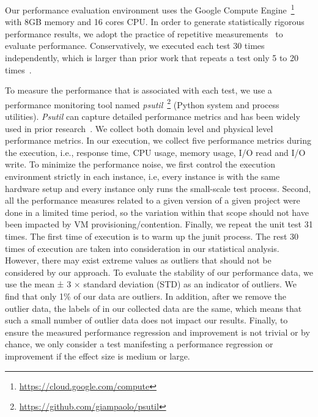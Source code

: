 
Our performance evaluation environment uses the Google Compute Engine~\footnote{\url{https://cloud.google.com/compute}} with 8GB memory and 16 cores CPU. In order to generate statistically rigorous performance results, we adopt the practice of repetitive measurements~\cite{peterfse} to evaluate performance. Conservatively, we executed each test 30 times independently, which is larger than prior work that  %
repeats a test only 5 to 20 times~\cite{Laaber2018MSR, Leitner2016TIT,DBLP:journals/ese/LaaberSL19}. 

To measure the performance that is associated with each test, we %
use a performance monitoring tool named \emph{psutil}~\footnote{\url{https://github.com/giampaolo/psutil}} (Python system and process utilities). %
\emph{Psutil} can capture detailed performance metrics and has been widely used in prior research~\cite{DBLP:conf/icsm/ChenS17,DBLP:conf/wosp/YaoPSSTS18}. We collect both domain level and physical level performance metrics. In our execution, we collect five performance metrics during the execution, i.e., response time, CPU usage, memory usage, I/O read and I/O write. 
To minimize the performance noise, we first control the execution environment strictly in each instance, i.e, every instance is with the same hardware setup and every instance only runs the small-scale test process. Second, all the performance measures related to a given version of a given project were done in a limited time period, so the variation within that scope should not have been impacted by VM provisioning/contention. Finally, we repeat the unit test 31 times. The first time of execution is to warm up the junit process. The rest 30 times of execution are taken into consideration in our statistical analysis. 
However, there may exist extreme values as outliers that should not be considered by our approach. To evaluate the stability of our performance data, we use the mean ± 3 × standard deviation (STD) as an indicator of outliers. We find that only 1\% of our data are outliers. In addition, after we remove the outlier data, the labels of \inconsistent in our collected data are the same, which means that such a small number of outlier data does not impact our results.  
Finally, to ensure the measured performance regression and improvement is not trivial or by chance, we only consider a test manifesting a performance regression or improvement if the effect size is medium or large.


